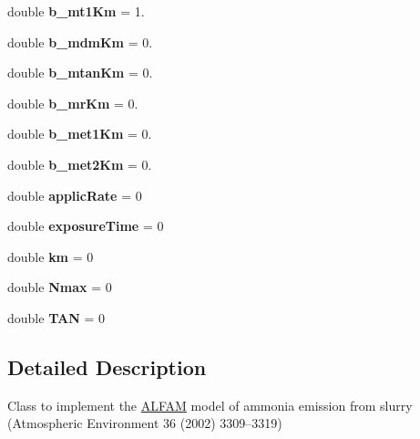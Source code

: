 \begin{DoxyCompactItemize}
double {\bfseries b\+\_\+mt1\+Km} = 1.
\item 
\mbox{\label{class_a_l_f_a_m_a3a5841a182efa3d2eb459685251e2731}} 
double {\bfseries b\+\_\+mdm\+Km} = 0.
\item 
\mbox{\label{class_a_l_f_a_m_a97420e446a5c3ff4782a4e3459e56126}} 
double {\bfseries b\+\_\+mtan\+Km} = 0.
\item 
\mbox{\label{class_a_l_f_a_m_a2a580260fb08cefccdcf59236090b149}} 
double {\bfseries b\+\_\+mr\+Km} = 0.
\item 
\mbox{\label{class_a_l_f_a_m_ab0c9b715e0b11629652093747a4e2a26}} 
double {\bfseries b\+\_\+met1\+Km} = 0.
\item 
\mbox{\label{class_a_l_f_a_m_afb713c277cbc896b038d493f2af143c4}} 
double {\bfseries b\+\_\+met2\+Km} = 0.
\item 
\mbox{\label{class_a_l_f_a_m_ab656c7583f34299c9eb0185ca5ddc533}} 
double {\bfseries applic\+Rate} = 0
\item 
\mbox{\label{class_a_l_f_a_m_ae6112359ba7fd8e1654c2a69009a2420}} 
double {\bfseries exposure\+Time} = 0
\item 
\mbox{\label{class_a_l_f_a_m_ab4efd6087708a1b18feae7c4dab0882e}} 
double {\bfseries km} = 0
\item 
\mbox{\label{class_a_l_f_a_m_a6f6fecb398e1e18a76b684aa7a09385c}} 
double {\bfseries Nmax} = 0
\item 
\mbox{\label{class_a_l_f_a_m_a2d2c07644fb7d996f28d46a77133b996}} 
double {\bfseries T\+AN} = 0
\end{DoxyCompactItemize}


\subsection{Detailed Description}
Class to implement the \mbox{\hyperlink{class_a_l_f_a_m}{A\+L\+F\+AM}} model of ammonia emission from slurry (Atmospheric Environment 36 (2002) 3309–3319) 

